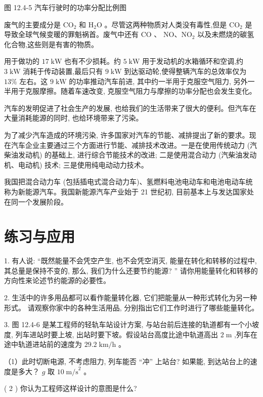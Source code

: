 \documentclass[10pt]{article}
\begin{document}
图 12.4-5 汽车行驶时的功率分配比例图

废气的主要成分是 \({\mathrm{{CO}}}_{2}\) 和 \({\mathrm{H}}_{2}\mathrm{O}\) 。尽管这两种物质对人类没有毒性,但是 \({\mathrm{{CO}}}_{2}\) 是导致全球气候变暖的罪魁祸首。废气中还有 \(\mathrm{{CO}}\) 、 \(\mathrm{{NO}}\text{、}{\mathrm{{NO}}}_{2}\) 以及未燃烧的碳氢化合物,这些则是有害的物质。

用于做功的 \({17}\mathrm{\;{kW}}\) 也有不少损耗。约 \(5\mathrm{\;{kW}}\) 用于发动机的水箱循环和空调,约 \(3\mathrm{\;{kW}}\) 消耗于传动装置,最后只有 \(9\mathrm{\;{kW}}\) 到达驱动轮,使得整辆汽车的总效率仅为 \({13}\%\) 左右。这 \(9\mathrm{\;{kW}}\) 的功率推动汽车前进, 其中约一半用于克服空气阻力, 另外一半用于克服摩擦。随着车速改变, 克服空气阻力与摩擦的功率分配也会发生变化。

汽车的发明促进了社会生产的发展, 也给我们的生活带来了很大的便利。但汽车在大量消耗能源的同时, 也给环境带来了污染。

为了减少汽车造成的环境污染, 许多国家对汽车的节能、减排提出了新的要求。现在汽车企业主要通过三个方面进行节能、减排技术改进。一是在使用传统动力 (汽柴油发动机) 的基础上, 进行综合节能技术的改进; 二是使用混合动力 (汽柴油发动机、电动机) 技术; 三是使用纯电动动力技术。

我国把混合动力车 (包括插电式混合动力车)、氢燃料电池电动车和电池电动车统称为新能源汽车。我国新能源汽车产业始于 21 世纪初, 目前基本上与发达国家处在同一个发展阶段。

\section*{练习与应用}

1. 有人说: “既然能量不会凭空产生, 也不会凭空消灭, 能量在转化和转移的过程中, 其总量是保持不变的, 那么, 我们为什么还要节约能源? ” 请你用能量转化和转移的方向性来论述节约能源的必要性。

2. 生活中的许多用品都可以看作能量转化器, 它们把能量从一种形式转化为另一种形式。 请观察你家中的各种生活用品, 分别指出它们工作时进行了哪些能量转化。

3. 图 12.4-6 是某工程师的轻轨车站设计方案, 与站台前后连接的轨道都有一个小坡度, 列车进站时要上坡, 出站时要下坡。假设站台高度比途中轨道高出 \(2\mathrm{\;m}\) ,列车在途中轨道进站前的速度为 \({29.2}\mathrm{\;{km}}/\mathrm{h}\) 。

（1）此时切断电源, 不考虑阻力, 列车能否 “冲” 上站台? 如果能, 到达站台上的速度是多大？ \(g\) 取 \({10}{\mathrm{\;m/s}}^{2}\) 。

( 2 ) 你认为工程师这样设计的意图是什么?
\end{document}
